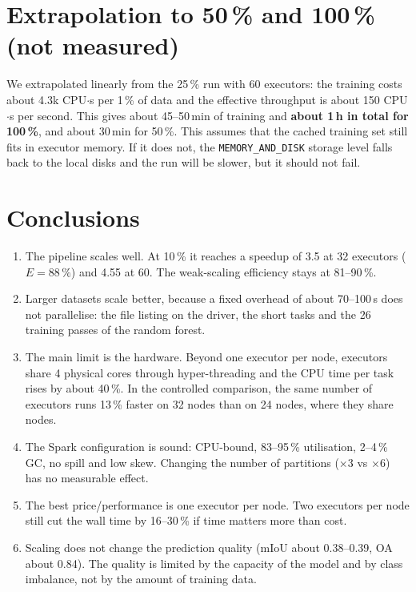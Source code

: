 \documentclass[a4paper, 11pt]{article}
\begin{document}
\section{Extrapolation to 50\,\% and 100\,\% (not measured)}

We extrapolated linearly from the 25\,\% run with 60 executors: the training costs about 4.3k CPU$\cdot$s
per 1\,\% of data and the effective throughput is about 150 CPU$\cdot$s per second. This gives about
45--50\,min of training and \textbf{about 1\,h in total for 100\,\%}, and about 30\,min for 50\,\%. This
assumes that the cached training set still fits in executor memory. If it does not, the
\texttt{MEMORY\_AND\_DISK} storage level falls back to the local disks and the run will be slower, but
it should not fail.

\section{Conclusions}

\begin{enumerate}
  \item The pipeline scales well. At 10\,\% it reaches a speedup of 3.5 at 32 executors ($E = 88\,\%$)
  and 4.55 at 60. The weak-scaling efficiency stays at 81--90\,\%.
  \item Larger datasets scale better, because a fixed overhead of about 70--100\,s does not parallelise:
  the file listing on the driver, the short tasks and the 26 training passes of the random forest.
  \item The main limit is the hardware. Beyond one executor per node, executors share 4 physical cores
  through hyper-threading and the CPU time per task rises by about 40\,\%. In the controlled comparison,
  the same number of executors runs 13\,\% faster on 32 nodes than on 24 nodes, where they share nodes.
  \item The Spark configuration is sound: CPU-bound, 83--95\,\% utilisation, 2--4\,\% GC, no spill and
  low skew. Changing the number of partitions ($\times 3$ vs $\times 6$) has no measurable effect.
  \item The best price/performance is one executor per node. Two executors per node still cut the wall
  time by 16--30\,\% if time matters more than cost.
  \item Scaling does not change the prediction quality (mIoU about 0.38--0.39, OA about 0.84). The
  quality is limited by the capacity of the model and by class imbalance, not by the amount of training data.
\end{enumerate}
\end{document}
